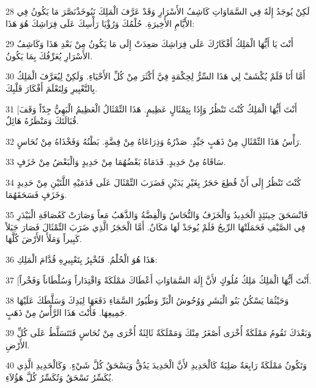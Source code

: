 \par 28 لَكِنْ يُوجَدُ إِلَهٌ فِي السَّمَاوَاتِ كَاشِفُ الأَسْرَارِ وَقَدْ عَرَّفَ الْمَلِكَ نَبُوخَذْنَصَّرَ مَا يَكُونُ فِي الأَيَّامِ الأَخِيرَةِ. حُلْمُكَ وَرُؤْيَا رَأْسِكَ عَلَى فِرَاشِكَ هُوَ هَذَا:
\par 29 أَنْتَ يَا أَيُّهَا الْمَلِكُ أَفْكَارُكَ عَلَى فِرَاشِكَ صَعِدَتْ إِلَى مَا يَكُونُ مِنْ بَعْدِ هَذَا وَكَاشِفُ الأَسْرَارِ يُعَرِّفُكَ بِمَا يَكُونُ.
\par 30 أَمَّا أَنَا فَلَمْ يُكْشَفْ لِي هَذَا السِّرُّ لِحِكْمَةٍ فِيَّ أَكْثَرَ مِنْ كُلِّ الأَحْيَاءِ. وَلَكِنْ لِيُعَرَّفَ الْمَلِكُ بِالتَّعْبِيرِ وَلِتَعْلَمَ أَفْكَارَ قَلْبِكَ.
\par 31 [أَنْتَ أَيُّهَا الْمَلِكُ كُنْتَ تَنْظُرُ وَإِذَا بِتِمْثَالٍ عَظِيمٍ. هَذَا التِّمْثَالُ الْعَظِيمُ الْبَهِيُّ جِدّاً وَقَفَ قُبَالَتَكَ وَمَنْظَرُهُ هَائِلٌ.
\par 32 رَأْسُ هَذَا التِّمْثَالِ مِنْ ذَهَبٍ جَيِّدٍ. صَدْرُهُ وَذِرَاعَاهُ مِنْ فِضَّةٍ. بَطْنُهُ وَفَخْذَاهُ مِنْ نُحَاسٍ.
\par 33 سَاقَاهُ مِنْ حَدِيدٍ. قَدَمَاهُ بَعْضُهُمَا مِنْ حَدِيدٍ وَالْبَعْضُ مِنْ خَزَفٍ.
\par 34 كُنْتَ تَنْظُرُ إِلَى أَنْ قُطِعَ حَجَرٌ بِغَيْرِ يَدَيْنِ فَضَرَبَ التِّمْثَالَ عَلَى قَدَمَيْهِ اللَّتَيْنِ مِنْ حَدِيدٍ وَخَزَفٍ فَسَحَقَهُمَا.
\par 35 فَانْسَحَقَ حِينَئِذٍ الْحَدِيدُ وَالْخَزَفُ وَالنُّحَاسُ وَالْفِضَّةُ وَالذَّهَبُ مَعاً وَصَارَتْ كَعُصَافَةِ الْبَيْدَرِ فِي الصَّيْفِ فَحَمَلَتْهَا الرِّيحُ فَلَمْ يُوجَدْ لَهَا مَكَانٌ. أَمَّا الْحَجَرُ الَّذِي ضَرَبَ التِّمْثَالَ فَصَارَ جَبَلاً كَبِيراً وَمَلَأَ الأَرْضَ كُلَّهَا.
\par 36 هَذَا هُوَ الْحُلْمُ. فَنُخْبِرُ بِتَعْبِيرِهِ قُدَّامَ الْمَلِكِ:
\par 37 [أَنْتَ أَيُّهَا الْمَلِكُ مَلِكُ مُلُوكٍ لأَنَّ إِلَهَ السَّمَاوَاتِ أَعْطَاكَ مَمْلَكَةً وَاقْتِدَاراً وَسُلْطَاناً وَفَخْراً.
\par 38 وَحَيْثُمَا يَسْكُنُ بَنُو الْبَشَرِ وَوُحُوشُ الْبَرِّ وَطُيُورُ السَّمَاءِ دَفَعَهَا لِيَدِكَ وَسَلَّطَكَ عَلَيْهَا جَمِيعِهَا. فَأَنْتَ هَذَا الرَّأْسُ مِنْ ذَهَبٍ.
\par 39 وَبَعْدَكَ تَقُومُ مَمْلَكَةٌ أُخْرَى أَصْغَرُ مِنْكَ وَمَمْلَكَةٌ ثَالِثَةٌ أُخْرَى مِنْ نُحَاسٍ فَتَتَسَلَّطُ عَلَى كُلِّ الأَرْضِ.
\par 40 وَتَكُونُ مَمْلَكَةٌ رَابِعَةٌ صَلِبَةٌ كَالْحَدِيدِ لأَنَّ الْحَدِيدَ يَدُقُّ وَيَسْحَقُ كُلَّ شَيْءٍ. وَكَالْحَدِيدِ الَّذِي يُكَسِّرُ تَسْحَقُ وَتُكَسِّرُ كُلَّ هَؤُلاَءِ.
